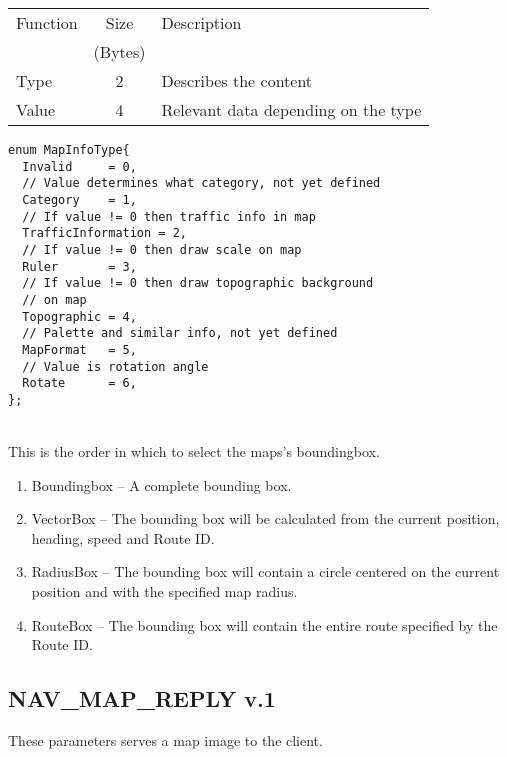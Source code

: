 \documentclass[a4paper]{article}
\begin{document}
\begin{list}{\textbf{ParamID}}{}
\begin{tabular}{|l|c|l|}\hline
Function & Size    & Description \\
         & (Bytes) &             \\\hline
Type     & 2       & Describes the content \\\hline
Value    & 4       & Relevant data depending on the type\\\hline
\end{tabular}
\begin{verbatim}
enum MapInfoType{
  Invalid     = 0,
  // Value determines what category, not yet defined
  Category    = 1,
  // If value != 0 then traffic info in map
  TrafficInformation = 2,
  // If value != 0 then draw scale on map
  Ruler       = 3,
  // If value != 0 then draw topographic background
  // on map
  Topographic = 4,
  // Palette and similar info, not yet defined
  MapFormat   = 5,
  // Value is rotation angle
  Rotate      = 6, 
};
\end{verbatim}
\end{list}


~\\
This is the order in which to select the maps's boundingbox.
\begin{enumerate}
\item Boundingbox --  A complete bounding box.
\item VectorBox   --  The bounding box will be calculated from the
  current position, heading, speed and Route ID.
\item RadiusBox   --  The bounding box will contain a circle
  centered on the current position and with the specified map radius.
\item RouteBox    -- The bounding box will contain the entire route
  specified by the Route ID.
\end{enumerate}


\subsection{NAV\_MAP\_REPLY v.1}

These parameters serves a map image to the client.
\end{document}
